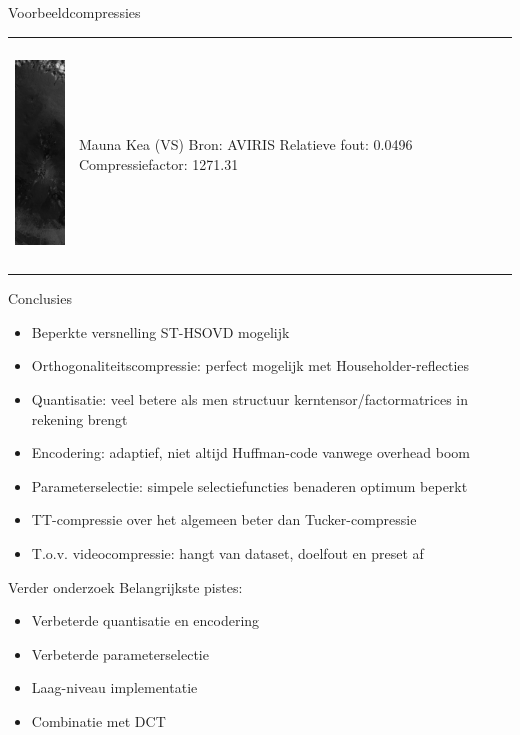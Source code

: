 \documentclass[t,12pt,dutch
\ifx\beamermode\undefined\else,\beamermode\fi
]{beamer}
\begin{document}
\begin{frame}{Voorbeeldcompressies}

\begin{table}[H]
\centering
\begin{tabular}{C{0.6\textwidth}  L{0.4\textwidth}}
\includegraphics[height=6cm]{images/example_compression_Mauna_Kea_0_05.png}
&
Mauna Kea (VS)\newline
Bron: AVIRIS\newline
\vspace{5mm}
Relatieve fout: 0.0496
Compressiefactor: 1271.31
\end{tabular}
\end{table}

\end{frame}

\begin{frame}{Conclusies}
\begin{itemize}
\item Beperkte versnelling ST-HSOVD mogelijk
\item Orthogonaliteitscompressie: perfect mogelijk met Householder-reflecties
\item Quantisatie: veel betere als men structuur kerntensor/factormatrices in rekening brengt
\item Encodering: adaptief, niet altijd Huffman-code vanwege overhead boom
\item Parameterselectie: simpele selectiefuncties benaderen optimum beperkt
\item TT-compressie over het algemeen beter dan Tucker-compressie
\item T.o.v. videocompressie: hangt van dataset, doelfout en preset af
\end{itemize}
\end{frame}

\begin{frame}{Verder onderzoek}
Belangrijkste pistes:
\begin{itemize}
\item Verbeterde quantisatie en encodering
\item Verbeterde parameterselectie
\item Laag-niveau implementatie
\item Combinatie met DCT
\end{itemize}
\end{frame}
\end{document}
